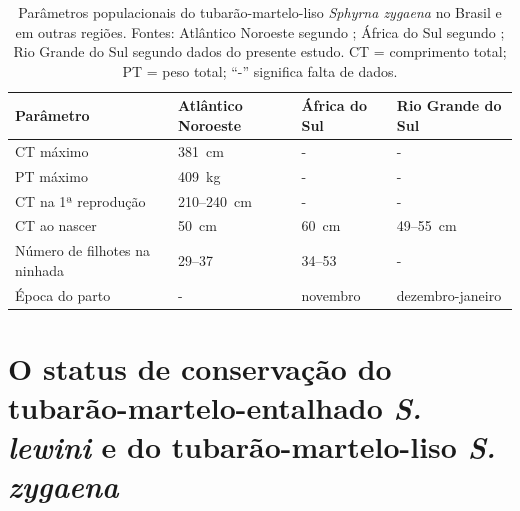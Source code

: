 \documentclass[a4paper,11pt,twoside,showtrims,onecolumn,openright,final]{memoir}
\begin{document}
\begin{table}
\caption[Parâmetros populacionais do tubarão-martelo-liso \emph{Sphyrna zygaena} no Brasil e em outras regiões]
        {Parâmetros populacionais do tubarão-martelo-liso \emph{Sphyrna zygaena} no Brasil e em outras regiões. 
         Fontes: Atlântico Noroeste segundo \citet{bigelow1948}; 
         África do Sul segundo \citet{bass1975}; 
         Rio Grande do Sul segundo dados do presente estudo. 
         CT = comprimento total; PT = peso total; ``-'' significa falta de dados.}  
\label{tab:zygaena-parpopulacional}
\begin{small}
\begin{tabularx}{\textwidth}{XXXX}
\toprule
Parâmetro		& Atlântico Noroeste		& África do Sul		& Rio Grande do Sul	\\
\midrule
CT máximo		& 381~cm			& -			& -			\\
\addlinespace
PT máximo		& 409~kg			& -			& -			\\
\addlinespace
CT na 1ª reprodução	& 210--240~cm			& -			& -			\\
\addlinespace
CT ao nascer		& 50~cm				& 60~cm			& 49--55~cm		\\
\addlinespace
Número de filhotes 
na ninhada		& 29--37			& 34--53		& -			\\
\addlinespace
Época do parto		& -				& novembro		& dezembro-janeiro	\\
\bottomrule
\end{tabularx}
\end{small}
\end{table}


\section*{O status de conservação do tubarão-martelo-entalhado \emph{S. lewini}
          e do tubarão-martelo-liso \emph{S. zygaena}}
\end{document}
